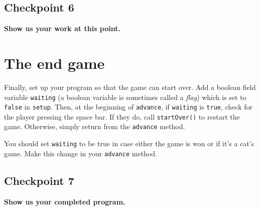 \documentclass[12pt]{article}
\newcommand{\code}{\texttt}
\begin{document}
\subsection*{Checkpoint 6}
{\bf
Show us your work at this point.
}

\section*{The end game}

Finally, set up your program so that the game can start over.
Add a boolean field variable \code{waiting}
(a boolean variable is sometimes called a {\em flag})
which is set to \code{false} in \code{setup}.
Then, at the beginning of \code{advance},
if \code{waiting} is \code{true}, check for the
player pressing the space bar.
If they do, call \code{startOver()} to restart the game.
Otherwise, simply return from the \code{advance} method. 

You should set \code{waiting} to be true
in case either the game is won or if it's a cat's game.
Make this change in your \code{advance} method.

\subsection*{Checkpoint 7}
{\bf
Show us your completed program.
}
\end{document}
